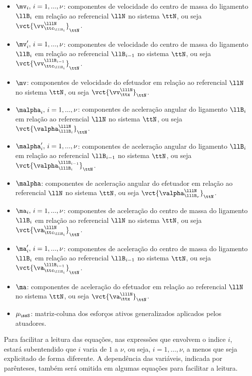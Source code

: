 \documentclass[]{politex}
\begin{document}
\begin{itemize}
\item $\mv_i, \,i=1, ..., \nu$: componentes de velocidade do centro de massa do ligamento $\llB_i$ em relação ao referencial $\llN$ no sistema $\ttN$, ou seja $\vct{\vv_{\ttc_{\lllB_i}}^{\lllN}}_\ttN$.
\item $\mv'_i, \,i=1, ..., \nu$: componentes de velocidade do centro de massa do ligamento $\llB_i$ em relação ao referencial $\llB_{i-1}$ no sistema $\ttN$, ou seja $\vct{\vv_{\ttc_{\lllB_i}}^{\lllB_{i-1}}}_\ttN$.
\item $\mv$: componentes de velocidade do efetuador em relação ao referencial $\llN$ no sistema $\ttN$, ou seja $\vct{\vv_{\ttx}^{\lllN}}_\ttN$.
\item $\malpha_i, \,i=1, ..., \nu$: componentes de aceleração angular do ligamento $\llB_i$ em relação ao referencial $\llN$ no sistema $\ttN$, ou seja $\vct{\valpha_{\lllB_i}^{\lllN}}_\ttN$.
\item $\malpha'_i, \,i=1, ..., \nu$: componentes de aceleração angular do ligamento $\llB_i$ em relação ao referencial $\llB_{i-1}$ no sistema $\ttN$, ou seja $\vct{\valpha_{\lllB_i}^{\lllB_{i-1}}}_\ttN$.
\item $\malpha$: componentes de aceleração angular do efetuador em relação ao referencial $\llN$ no sistema $\ttN$, ou seja $\vct{\valpha_{\lllB_\nu}^{\lllN}}_\ttN$.
\item $\ma_i, \,i=1, ..., \nu$: componentes de aceleração do centro de massa do ligamento $\llB_i$ em relação ao referencial $\llN$ no sistema $\ttN$, ou seja $\vct{\va_{\ttc_{\lllB_i}}^{\lllN}}_\ttN$.
\item $\ma'_i, \,i=1, ..., \nu$: componentes de aceleração do centro de massa do ligamento $\llB_i$ em relação ao referencial $\llB_{i-1}$ no sistema $\ttN$, ou seja $\vct{\va_{\ttc_{\lllB_i}}^{\lllB_{i-1}}}_\ttN$.
\item $\ma$: componentes de aceleração do efetuador em relação ao referencial $\llN$ no sistema $\ttN$, ou seja $\vct{\va_{\ttx}^{\lllN}}_\ttN$.
\item $\mu_\ssS$: matriz-coluna dos esforços ativos generalizados aplicados pelos atuadores.
\end{itemize}

Para facilitar a leitura das equações, nas expressões que envolvem o indice $i$, estará subentendido que $i$ varia de $1$ a $\nu$, ou seja, $i=1,\hdots,\nu$, a menos que seja explicitado de forma diferente. A dependência das variáveis, indicada por parênteses, também será omitida em algumas equações para facilitar a leitura.
\end{document}
